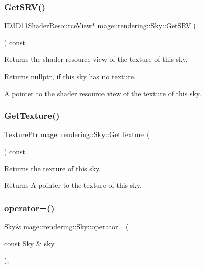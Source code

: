 \subsubsection{\texorpdfstring{Get\+S\+R\+V()}{GetSRV()}}
{\footnotesize\ttfamily I\+D3\+D11\+Shader\+Resource\+View$\ast$ mage\+::rendering\+::\+Sky\+::\+Get\+S\+RV (\begin{DoxyParamCaption}{ }\end{DoxyParamCaption}) const\hspace{0.3cm}{\ttfamily [noexcept]}}

Returns the shader resource view of the texture of this sky.

\begin{DoxyReturn}{Returns}
{\ttfamily nullptr}, if this sky has no texture. 

A pointer to the shader resource view of the texture of this sky. 
\end{DoxyReturn}
\hypertarget{classmage_1_1rendering_1_1_sky_a575698f7fafad47d544f88bf4e2eea5e}{}\label{classmage_1_1rendering_1_1_sky_a575698f7fafad47d544f88bf4e2eea5e} 
\subsubsection{\texorpdfstring{Get\+Texture()}{GetTexture()}}
{\footnotesize\ttfamily \hyperlink{namespacemage_1_1rendering_a6f3ae54f825328465b0cdde0f0de4a36}{Texture\+Ptr} mage\+::rendering\+::\+Sky\+::\+Get\+Texture (\begin{DoxyParamCaption}{ }\end{DoxyParamCaption}) const\hspace{0.3cm}{\ttfamily [noexcept]}}

Returns the texture of this sky.

\begin{DoxyReturn}{Returns}
A pointer to the texture of this sky. 
\end{DoxyReturn}
\hypertarget{classmage_1_1rendering_1_1_sky_a9654c598bd30fee1b0892b0abf7b7c96}{}\label{classmage_1_1rendering_1_1_sky_a9654c598bd30fee1b0892b0abf7b7c96} 
\subsubsection{\texorpdfstring{operator=()}{operator=()}\hspace{0.1cm}{\footnotesize\ttfamily [1/2]}}
{\footnotesize\ttfamily \hyperlink{classmage_1_1rendering_1_1_sky}{Sky}\& mage\+::rendering\+::\+Sky\+::operator= (\begin{DoxyParamCaption}\item[{const \hyperlink{classmage_1_1rendering_1_1_sky}{Sky} \&}]{sky }\end{DoxyParamCaption})\hspace{0.3cm}{\ttfamily [default]}, {\ttfamily [noexcept]}}

